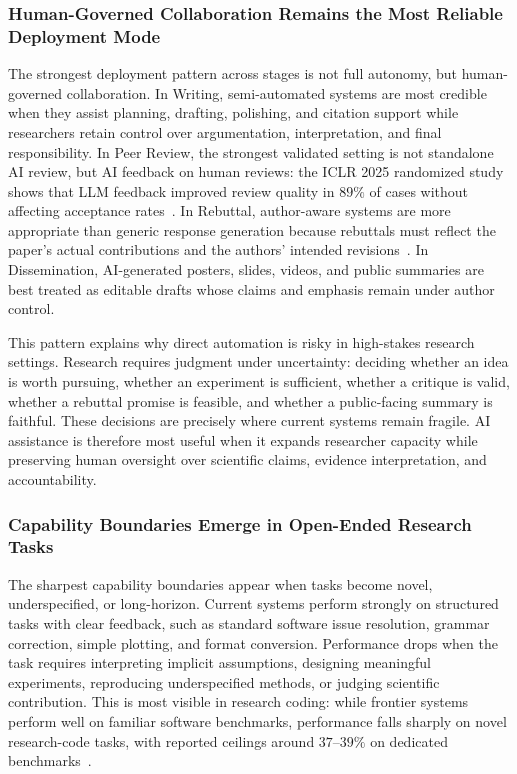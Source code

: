 \subsubsection{Human-Governed Collaboration Remains the Most Reliable Deployment Mode}
\label{sec:insight_collaboration}

The strongest deployment pattern across stages is not full autonomy, but human-governed collaboration. In Writing, semi-automated systems are most credible when they assist planning, drafting, polishing, and citation support while researchers retain control over argumentation, interpretation, and final responsibility. In Peer Review, the strongest validated setting is not standalone AI review, but AI feedback on human reviews: the ICLR 2025 randomized study shows that LLM feedback improved review quality in $89\%$ of cases without affecting acceptance rates~\cite{iclr2025reviewstudy}. In Rebuttal, author-aware systems are more appropriate than generic response generation because rebuttals must reflect the paper's actual contributions and the authors' intended revisions~\cite{ruan2026authorinloop}. In Dissemination, AI-generated posters, slides, videos, and public summaries are best treated as editable drafts whose claims and emphasis remain under author control.

This pattern explains why direct automation is risky in high-stakes research settings. Research requires judgment under uncertainty: deciding whether an idea is worth pursuing, whether an experiment is sufficient, whether a critique is valid, whether a rebuttal promise is feasible, and whether a public-facing summary is faithful. These decisions are precisely where current systems remain fragile. AI assistance is therefore most useful when it expands researcher capacity while preserving human oversight over scientific claims, evidence interpretation, and accountability.


\subsubsection{Capability Boundaries Emerge in Open-Ended Research Tasks}
\label{sec:insight_open_ended}

The sharpest capability boundaries appear when tasks become novel, underspecified, or long-horizon. Current systems perform strongly on structured tasks with clear feedback, such as standard software issue resolution, grammar correction, simple plotting, and format conversion. Performance drops when the task requires interpreting implicit assumptions, designing meaningful experiments, reproducing underspecified methods, or judging scientific contribution. This is most visible in research coding: while frontier systems perform well on familiar software benchmarks, performance falls sharply on novel research-code tasks, with reported ceilings around $37$--$39\%$ on dedicated benchmarks~\cite{researchcodebench2025,scireplicatebench2025}.

